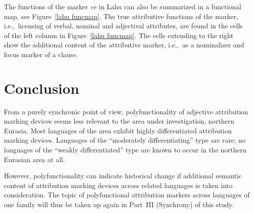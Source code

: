 The functions of the marker \textit{ve} in Lahu can also be summarized in a functional map, see Figure~\ref{lahu funcmap}. The true attributive functions of the marker, i.e.,~licensing of verbal, nominal and adjectival attributes, are found in the cells of the left column in Figure~\ref{lahu funcmap}. The cells extending to the right show the additional content of the attributive marker, i.e.,~as a nominalizer and focus marker of a clause.

\section{Conclusion}
From a purely synchronic point of view, polyfunctionality of adjective attribution marking devices seems less relevant to the area under investigation, northern Eurasia. Most languages of the area exhibit highly differentiated attribution marking devices. Languages of the “moderately differentiating” type are rare; no languages of the “weakly differentiated” type are known to occur in the northern Eurasian area at all.

However, polyfunctionality can indicate historical change if additional semantic content of attribution marking devices across related languages is taken into consideration. The topic of polyfunctional attribution markers across languages of one family will thus be taken up again in Part~III (Synchrony) of this study.

